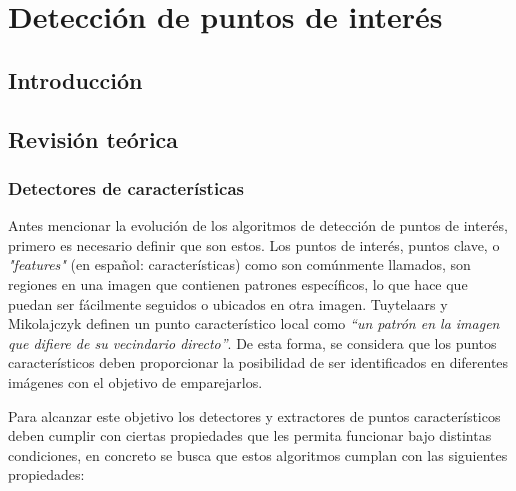 \chapter{Detección de puntos de interés}
\label{capitulo3}


\section{Introducción}


\section{Revisión teórica}

\subsection{Detectores de características}

Antes mencionar la evolución de los algoritmos de detección de puntos de interés, primero es necesario definir que son estos. Los puntos de interés, puntos clave, o \textit{"features"} (en español: características) como son comúnmente llamados, son regiones en una imagen que contienen patrones específicos, lo que hace que puedan ser fácilmente seguidos o ubicados en otra imagen. Tuytelaars y Mikolajczyk \cite{Tuytelaars} definen un punto característico local como \textit{``un patrón en la imagen que difiere de su vecindario directo''}. De esta forma, se considera que los puntos característicos deben proporcionar la posibilidad de ser identificados en diferentes imágenes con el objetivo de emparejarlos.

Para alcanzar este objetivo los detectores y extractores de puntos característicos deben cumplir con ciertas propiedades que les permita funcionar bajo distintas condiciones, en concreto se busca que estos algoritmos cumplan con las siguientes propiedades:

